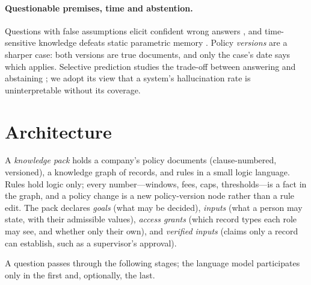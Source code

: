 \documentclass[11pt]{article}
\begin{document}
\paragraph{Questionable premises, time and abstention.} Questions with false assumptions
elicit confident wrong answers \citep{kim2023qa2,yu2023crepe}, and time-sensitive knowledge
defeats static parametric memory \citep{vu2023freshllms}. Policy \emph{versions} are a
sharper case: both versions are true documents, and only the case's date says which
applies. Selective prediction studies the trade-off between answering and abstaining
\citep{elyaniv2010selective,kamath2020selective}; we adopt its view that a system's
hallucination rate is uninterpretable without its coverage.

\section{Architecture}\label{sec:architecture}

A \emph{knowledge pack} holds a company's policy documents (clause-numbered, versioned), a
knowledge graph of records, and rules in a small logic language. Rules hold logic only;
every number---windows, fees, caps, thresholds---is a fact in the graph, and a policy
change is a new policy-version node rather than a rule edit. The pack declares
\emph{goals} (what may be decided), \emph{inputs} (what a person may state, with their
admissible values), \emph{access grants} (which record types each role may see, and
whether only their own), and \emph{verified inputs} (claims only a record can establish,
such as a supervisor's approval).

A question passes through the following stages; the language model participates only in
the first and, optionally, the last.
\end{document}
